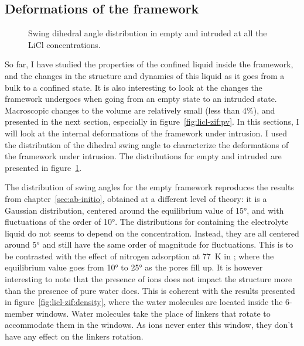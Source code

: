 \documentclass[thesis]{subfiles}
\begin{document}
\subsection{Deformations of the framework}
\label{sec:licl-zifdeformation}

\begin{figure}[ht]
    \centering
    
    \caption{Swing dihedral angle distribution in empty and intruded  at
    all the LiCl concentrations.}
    \label{fig:licl-zif:dihedrals}
\end{figure}

So far, I have studied the properties of the confined liquid inside the 
framework, and the changes in the structure and dynamics of this liquid as it
goes from a bulk to a confined state. It is also interesting to look at the
changes the framework undergoes when going from an empty state to an intruded
state. Macroscopic changes to the volume are relatively small (less than 4\%),
and presented in the next section, especially in figure~\ref{fig:licl-zif:pv}.
In this sections, I will look at the internal deformations of the framework
under intrusion. I used the distribution of the  dihedral swing
angle to characterize the deformations of the framework under intrusion. The
distributions for empty and intruded  are presented in
figure~\ref{fig:licl-zif:dihedrals}.

The distribution of swing angles for the empty framework reproduces the results
from chapter~\ref{sec:ab-initio}, obtained at a different level of theory: it is
a Gaussian distribution, centered around the equilibrium value of 15°, and with
fluctuations of the order of 10°. The distributions for  containing the
electrolyte liquid do not seems to depend on the concentration. Instead, they
are all centered around 5° and still have the same order of magnitude for
fluctuations. This is to be contrasted with the effect of nitrogen adsorption at
\SI{77}{K} in ; where the equilibrium value goes from 10° to 25° as the
pores fill up. It is however interesting to note that the presence of ions does
not impact the structure more than the presence of pure water does. This is
coherent with the results presented in figure~\ref{fig:licl-zif:density}, where
the water molecules are located inside the 6-member windows. Water molecules
take the place of linkers that rotate to accommodate them in the windows. As
ions never enter this window, they don't have any effect on the linkers
rotation.
\end{document}
